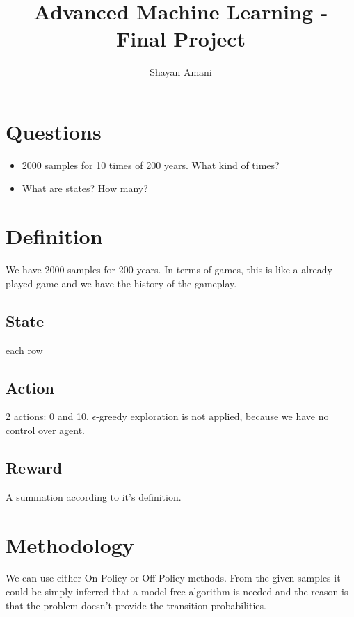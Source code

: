 \documentclass[a4paper,12pt]{article}
\title{Advanced Machine Learning - Final Project}
\author{Shayan Amani}
\begin{document}
\maketitle

\section{Questions}
\begin{itemize}
    \item 2000 samples for 10 times of 200 years. What kind of times?
    \item What are states? How many?
\end{itemize}

\section{Definition}
We have 2000 samples for 200 years. In terms of games, this is like a already played game and we have the history of the gameplay.

\subsection{State}
each row 

\subsection{Action}
2 actions: 0 and 10.
$\epsilon$-greedy exploration is not applied, because we have no control over agent.

\subsection{Reward}
A summation according to it's definition.


\section{Methodology}
We can use either On-Policy or Off-Policy methods. From the given samples it could be simply inferred that a model-free algorithm is needed and the reason is that the problem doesn't provide the transition probabilities.
\end{document}
